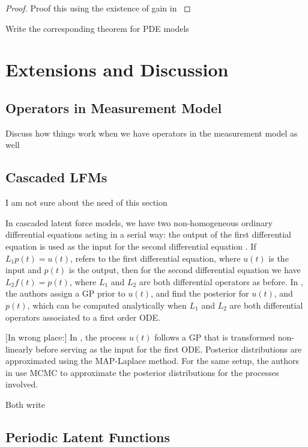 \documentclass[journal]{IEEEtran}
\newcommand{\simo}[1]{{\color{red}#1}}
\begin{document}
\begin{proof}
  \simo{Proof this using the existence of gain in \cite{Wonham:1985}}
\end{proof}

\simo{Write the corresponding theorem for PDE models}

\section{Extensions and Discussion}

\subsection{Operators in Measurement Model}

\simo{Discuss how things work when we have operators in the measurement model as well}

\subsection{Cascaded LFMs}

\simo{I am not sure about the need of this section}

In cascaded latent force models, we have two non-homogeneous ordinary differential equations acting in a serial way:
the output of the first differential equation is used as the input for the second differential equation
\cite{Honkela:PNAS10}. If $L_1p(t) = u(t)$, refers to the first differential equation,
where $u(t)$ is the input and $p(t)$ is the output, then for the second differential equation we have $L_2f(t) = p(t)$,
where $L_1$ and $L_2$ are both differential operators as before. In \cite{Honkela:PNAS10}, the authors assign a
GP prior to $u(t)$, and find the posterior for $u(t)$, and $p(t)$, which can be computed analytically when $L_1$ and $L_2$
are both differential operators associated to a first order ODE.

\simo{[In wrong place:] In \cite{Gao:latent08}, the process $u(t)$ follows
a GP that is transformed non-linearly before serving as the input for the first ODE. Posterior distributions are
approximated using the MAP-Laplace method. For the same setup, the authors in \cite{Titsias:BMC:2012} use MCMC to
approximate the posterior distributions for the processes involved.}

\simo{Both write}

\subsection{Periodic Latent Functions}
\end{document}
